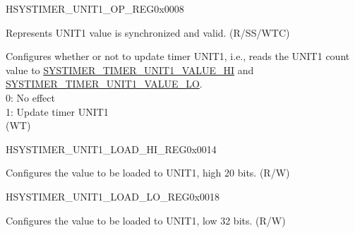 \begin{register}{H}{SYSTIMER\_UNIT1\_OP\_REG}{0x0008}\label{regdesc:SYSTIMERUNIT1OPREG}
%
%
%
%
\regnewline%
\begin{regdesc}\begin{reglist}
\label{fielddesc:SYSTIMERTIMERUNIT1VALUEVALID}\item [SYSTIMER\_TIMER\_UNIT1\_VALUE\_VALID] Represents UNIT1 value is synchronized and valid. (R/SS/WTC)
\label{fielddesc:SYSTIMERTIMERUNIT1UPDATE}\item [SYSTIMER\_TIMER\_UNIT1\_UPDATE] Configures whether or not to update timer UNIT1, i.e., reads the UNIT1 count value to \hyperref[fielddesc:SYSTIMERTIMERUNIT0VALUEHI]{SYSTIMER\_TIMER\_UNIT1\_VALUE\_HI} and \hyperref[fielddesc:SYSTIMERTIMERUNIT0VALUELO]{SYSTIMER\_TIMER\_UNIT1\_VALUE\_LO}. \\
0: No effect \\
1: Update timer UNIT1\\
(WT)
\end{reglist}\end{regdesc}
\end{register}


\begin{register}{H}{SYSTIMER\_UNIT1\_LOAD\_HI\_REG}{0x0014}\label{regdesc:SYSTIMERUNIT1LOADHIREG}
%
%
\regnewline%
\begin{regdesc}\begin{reglist}
\label{fielddesc:SYSTIMERTIMERUNIT1LOADHI}\item [SYSTIMER\_TIMER\_UNIT1\_LOAD\_HI] Configures the value to be loaded to UNIT1, high 20 bits. (R/W)
\end{reglist}\end{regdesc}
\end{register}


\begin{register}{H}{SYSTIMER\_UNIT1\_LOAD\_LO\_REG}{0x0018}\label{regdesc:SYSTIMERUNIT1LOADLOREG}
%
\regnewline%
\begin{regdesc}\begin{reglist}
\label{fielddesc:SYSTIMERTIMERUNIT1LOADLO}\item [SYSTIMER\_TIMER\_UNIT1\_LOAD\_LO] Configures the value to be loaded to UNIT1, low 32 bits. (R/W)
\end{reglist}\end{regdesc}
\end{register}


